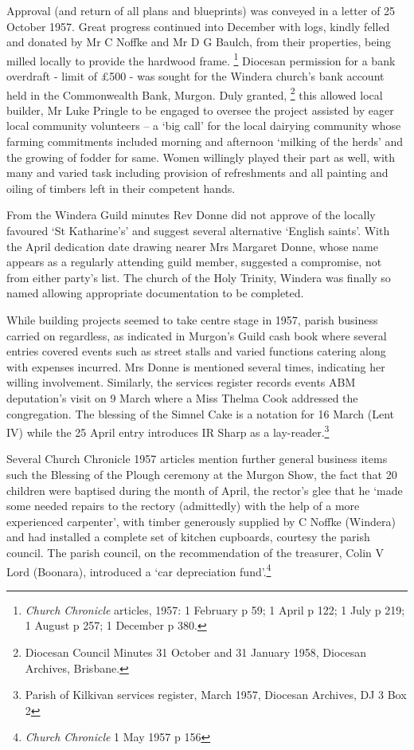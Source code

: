 Approval (and return of all plans and blueprints) was conveyed in a letter of 25 October 1957. Great progress continued into December with logs, kindly felled and donated by Mr C Noffke and Mr D G Baulch, from their properties, being milled locally to provide the hardwood frame. \footnote{\emph{Church Chronicle} articles, 1957: 1 February p 59; 1 April p 122; 1 July p 219; 1 August p 257; 1 December p 380.} Diocesan permission for a bank overdraft - limit of £500 - was sought for the Windera church's bank account held in the Commonwealth Bank, Murgon. Duly granted, \footnote{Diocesan Council Minutes 31 October and 31 January 1958, Diocesan Archives, Brisbane.} this allowed local builder, Mr Luke Pringle to be engaged to oversee the project assisted by eager local community volunteers -- a `big call' for the local dairying community whose farming commitments included morning and afternoon `milking of the herds' and the growing of fodder for same. Women willingly played their part as well, with many and varied task including provision of refreshments and all painting and oiling of timbers left in their competent hands.

From the Windera Guild minutes Rev Donne did not approve of the locally favoured `St Katharine's' and suggest several alternative `English saints'. With the April dedication date drawing nearer Mrs Margaret Donne, whose name appears as a regularly attending guild member, suggested a compromise, not from either party's list. The church of the Holy Trinity, Windera was finally so named allowing appropriate documentation to be completed.

While building projects seemed to take centre stage in 1957, parish business carried on regardless, as indicated in Murgon's Guild cash book where several entries covered events such as street stalls and varied functions catering along with expenses incurred. Mrs Donne is mentioned several times, indicating her willing involvement. Similarly, the services register records events ABM deputation's visit on 9 March where a Miss Thelma Cook addressed the congregation. The blessing of the Simnel Cake is a notation for 16 March (Lent IV) while the 25 April entry introduces IR Sharp as a lay-reader.\footnote{Parish of Kilkivan services register, March 1957, Diocesan Archives, DJ 3 Box 2}

Several Church Chronicle 1957 articles mention further general business items such the Blessing of the Plough ceremony at the Murgon Show, the fact that 20 children were baptised during the month of April, the rector's glee that he `made some needed repairs to the rectory (admittedly) with the help of a more experienced carpenter', with timber generously supplied by C Noffke (Windera) and had installed a complete set of kitchen cupboards, courtesy the parish council. The parish council, on the recommendation of the treasurer, Colin V Lord (Boonara), introduced a `car depreciation fund'.\footnote{\emph{Church Chronicle} 1 May 1957 p 156}

